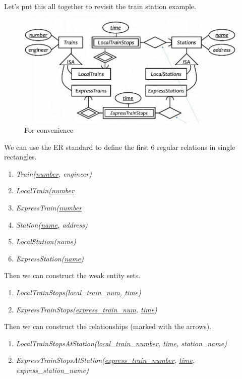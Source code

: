 \documentclass{article}
\begin{document}
    \begin{example}
      Let's put this all together to revisit the train station example. 
      \begin{figure}[H]
        \centering 
        \includegraphics[scale=0.4]{img/final_station.png}
        \caption{For convenience} 
        \label{fig:final_station}
      \end{figure}
      We can use the ER standard to define the first 6 regular relations in single rectangles.  
      \begin{enumerate}
        \item \textit{Train(\underline{number}, engineer)}
        \item \textit{LocalTrain(\underline{number}}
        \item \textit{ExpressTrain(\underline{number}}
        \item \textit{Station(\underline{name}, address)}
        \item \textit{LocalStation(\underline{name})}
        \item \textit{ExpressStation(\underline{name})}
      \end{enumerate}
      Then we can construct the weak entity sets. 
      \begin{enumerate}
        \item \textit{LocalTrainStops(\underline{local\_train\_num}, \underline{time})}
        \item \textit{ExpressTrainStops(\underline{express\_train\_num}, \underline{time})}
      \end{enumerate}
      Then we can construct the relationships (marked with the arrows).  
      \begin{enumerate}
        \item \textit{LocalTrainStopsAtStation(\underline{local\_train\_number}, \underline{time}, station\_name)}
        \item \textit{ExpressTrainStopsAtStation(\underline{express\_train\_number}, \underline{time}, express\_station\_name)}

\end{enumerate}
\end{example}
\end{document}
